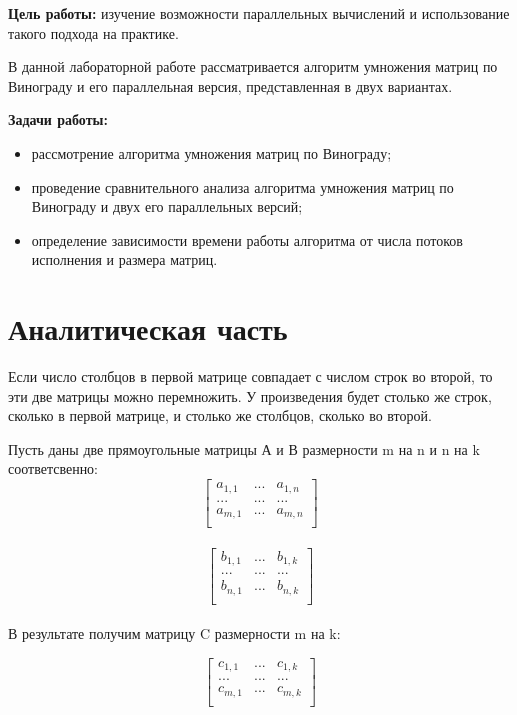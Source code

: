 \documentclass[12pt]{report}
\begin{document}
\textbf{Цель работы:} изучение возможности параллельных вычислений и использование такого подхода на практике.\vspace{\baselineskip}

В данной лабораторной работе рассматривается алгоритм умножения матриц по Винограду и его параллельная версия, представленная в двух вариантах.\vspace{\baselineskip}

\textbf{Задачи работы:}
\begin{itemize}
	\item рассмотрение алгоритма умножения матриц по Винограду;
	\item проведение сравнительного анализа алгоритма умножения матриц по Винограду и двух его параллельных версий;
	\item определение зависимости времени работы алгоритма от числа потоков исполнения и размера матриц.
\end{itemize}

\chapter{Аналитическая часть}

Если число столбцов в первой матрице совпадает с числом строк во второй, то эти две матрицы можно перемножить. У произведения будет столько же строк, сколько в первой матрице, и столько же столбцов, сколько во второй.

Пусть даны две прямоугольные матрицы А и В размерности m на n и n на k соответсвенно: 
\[ \begin{bmatrix}
	a_{1,1} & ... & a_{1,n} \\
	... & ... & ... \\
	a_{m,1} & ... & a_{m,n} \\
\end{bmatrix} \]\\

\[ \begin{bmatrix}
	b_{1,1} & ... & b_{1,k} \\
	... & ... & ... \\
	b_{n,1} & ... & b_{n,k} \\
\end{bmatrix} \]\\

В результате получим матрицу C размерности m на k:

\[ \begin{bmatrix}
	c_{1,1} & ... & c_{1,k} \\
	... & ... & ... \\
	c_{m,1} & ... & c_{m,k} \\
\end{bmatrix} \]\\
\end{document}
